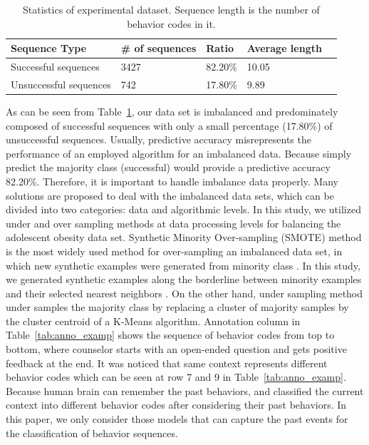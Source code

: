\documentclass{amia_summit_2018}
\begin{document}
\begin{table}[h]
\centering
\caption{Statistics of experimental dataset. Sequence length is the number of behavior codes in it.}
\label{tab:data_dist}
  \begin{tabular}{|l|l|l|l|l|}
  \hline
   \textbf{Sequence Type} & \textbf{\# of sequences}  & \textbf{Ratio} & \textbf{Average length} \\ \hline      
Successful sequences & 3427 & 82.20\% & 10.05 \\\hline
Unsuccessful sequences & 742 & 17.80\% & 9.89 \\\hline
  \end{tabular}
\end{table} 

As can be seen from Table~\ref{tab:data_dist}, our data set is imbalanced and predominately composed of successful sequences with only a small percentage (17.80\%) of unsuccessful sequences. Usually, predictive accuracy misrepresents the performance of an employed algorithm for an imbalanced data. Because simply predict the majority class (successful) would provide a predictive accuracy 82.20\%. Therefore, it is important to handle imbalance data properly. Many solutions are proposed to deal with the imbalanced data sets, which can be divided into two categories: data and algorithmic levels. In this study, we utilized under and over sampling methods at data processing levels for balancing the adolescent obesity data set. Synthetic Minority Over-sampling (SMOTE) method is the most widely used method for over-sampling an imbalanced data set, in which new synthetic examples were generated from minority class \cite{chawla2002smote}. In this study, we generated synthetic examples along the borderline between minority examples and their selected nearest neighbors \cite{nguyen2011borderline}. On the other hand, under sampling method under samples the majority class by replacing a cluster of majority samples by the cluster centroid of a K-Means algorithm. Annotation column in Table~\ref{tab:anno_examp} shows the sequence of behavior codes from top to bottom, where counselor starts with an open-ended question and gets positive feedback at the end. It was noticed that same context represents different behavior codes which can be seen at row 7 and 9 in Table~\ref{tab:anno_examp}. Because human brain can remember the past behaviors, and classified the current context into different behavior codes after considering their past behaviors. In this paper, we only consider those models that can capture the past events for the classification of behavior sequences.\\
\end{document}
